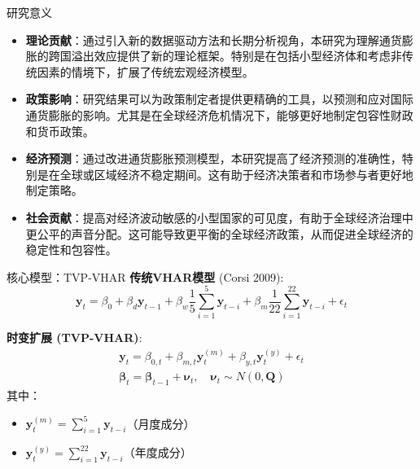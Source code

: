\documentclass{beamer}
\begin{document}
\begin{frame}{研究意义}
  \begin{itemize}
    \item \textbf{理论贡献}：通过引入新的数据驱动方法和长期分析视角，本研究为理解通货膨胀的跨国溢出效应提供了新的理论框架。特别是在包括小型经济体和考虑非传统因素的情境下，扩展了传统宏观经济模型。
    
    \item \textbf{政策影响}：研究结果可以为政策制定者提供更精确的工具，以预测和应对国际通货膨胀的影响。尤其是在全球经济危机情况下，能够更好地制定包容性财政和货币政策。
    
    \item \textbf{经济预测}：通过改进通货膨胀预测模型，本研究提高了经济预测的准确性，特别是在全球或区域经济不稳定期间。这有助于经济决策者和市场参与者更好地制定策略。
    
    \item \textbf{社会贡献}：提高对经济波动敏感的小型国家的可见度，有助于全球经济治理中更公平的声音分配。这可能导致更平衡的全球经济政策，从而促进全球经济的稳定性和包容性。
  \end{itemize}
\end{frame}
\begin{frame}{核心模型：TVP-VHAR}
\textbf{传统VHAR模型} (Corsi 2009):
\begin{equation*}
\boldsymbol{y}_t = \beta_0 + \beta_d \boldsymbol{y}_{t-1} + \beta_w \frac{1}{5}\sum_{i=1}^5 \boldsymbol{y}_{t-i} + \beta_m \frac{1}{22}\sum_{i=1}^{22} \boldsymbol{y}_{t-i} + \epsilon_t
\end{equation*}

\textbf{时变扩展 (TVP-VHAR)}:
\begin{gather*}
\boldsymbol{y}_t = \beta_{0,t}  + \beta_{m,t} \boldsymbol{y}_{t}^{(m)} + \beta_{y,t} \boldsymbol{y}_{t}^{(y)} + \epsilon_t \\
\boldsymbol{\beta}_t = \boldsymbol{\beta}_{t-1} + \boldsymbol{\nu}_t, \quad \boldsymbol{\nu}_t \sim N(0,\boldsymbol{Q})
\end{gather*}
其中：
\begin{itemize}
\item $\boldsymbol{y}_{t}^{(m)} = \sum_{i=1}^5 \boldsymbol{y}_{t-i}$（月度成分）
\item $\boldsymbol{y}_{t}^{(y)} = \sum_{i=1}^{22} \boldsymbol{y}_{t-i}$（年度成分）
\end{itemize}
\end{frame}
\end{document}
